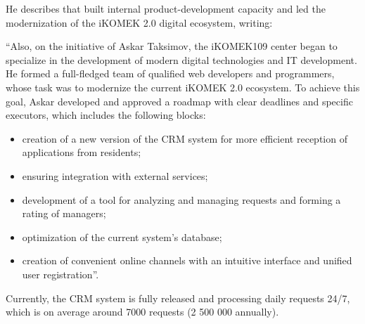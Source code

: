 He describes that \mrl{} built internal product-development capacity and led the modernization of the iKOMEK 2.0 digital ecosystem, writing:
\begin{fullquote}
``Also, on the initiative of Askar Taksimov, the iKOMEK109 center began to specialize in the development of modern digital technologies and IT development. He formed a full-fledged team of qualified web developers and programmers, whose task was to modernize the current iKOMEK 2.0 ecosystem. To achieve this goal, Askar developed and approved a roadmap with clear deadlines and specific executors, which includes the following blocks:
\begin{itemize}[nosep]
\item creation of a new version of the CRM system for more efficient reception of applications from residents;
\item ensuring integration with external services;
\item development of a tool for analyzing and managing requests and forming a rating of managers;
\item optimization of the current system's database;
\item creation of convenient online channels with an intuitive interface and unified user registration''.
\end{itemize}
\end{fullquote}
Currently, the CRM system is fully released and processing daily requests 24/7, which is on average around 7000 requests (2 500 000 annually).

